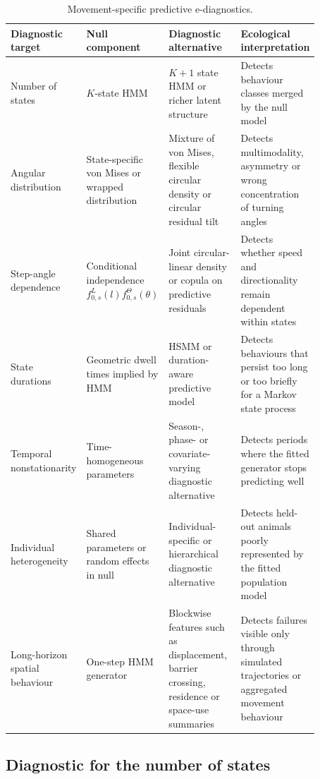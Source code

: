 \documentclass[pdflatex,sn-basic]{sn-jnl}
\theoremstyle{thmstyleone}
\theoremstyle{thmstyletwo}
\theoremstyle{thmstylethree}
\newcommand{\1}{\mathbf 1}
\begin{document}
\begin{table}[t]
\centering
\footnotesize
\begin{tabular}{@{}>{\raggedright\arraybackslash}p{0.17\linewidth}>{\raggedright\arraybackslash}p{0.23\linewidth}>{\raggedright\arraybackslash}p{0.25\linewidth}>{\raggedright\arraybackslash}p{0.22\linewidth}@{}}
\toprule
Diagnostic target & Null component & Diagnostic alternative & Ecological interpretation \\
\midrule
Number of states & $K$-state HMM & $K+1$ state HMM or richer latent structure & Detects behaviour classes merged by the null model \\
Angular distribution & State-specific von Mises or wrapped distribution & Mixture of von Mises, flexible circular density or circular residual tilt & Detects multimodality, asymmetry or wrong concentration of turning angles \\
Step-angle dependence & Conditional independence $f^L_{0,s}(l)f^\Theta_{0,s}(\theta)$ & Joint circular-linear density or copula on predictive residuals & Detects whether speed and directionality remain dependent within states \\
State durations & Geometric dwell times implied by HMM & HSMM or duration-aware predictive model & Detects behaviours that persist too long or too briefly for a Markov state process \\
Temporal nonstationarity & Time-homogeneous parameters & Season-, phase- or covariate-varying diagnostic alternative & Detects periods where the fitted generator stops predicting well \\
Individual heterogeneity & Shared parameters or random effects in null & Individual-specific or hierarchical diagnostic alternative & Detects held-out animals poorly represented by the fitted population model \\
Long-horizon spatial behaviour & One-step HMM generator & Blockwise features such as displacement, barrier crossing, residence or space-use summaries & Detects failures visible only through simulated trajectories or aggregated movement behaviour \\
\bottomrule
\end{tabular}
\caption{Movement-specific predictive e-diagnostics.}
\label{tab:diagnostics}
\end{table}

\subsection{Diagnostic for the number of states}
\end{document}
